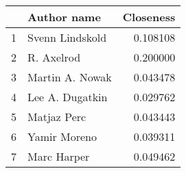 \begin{tabular}{llr}
\toprule
{} &      Author name &  Closeness \\
\midrule
1 &  Svenn Lindskold &   0.108108 \\
2 &       R. Axelrod &   0.200000 \\
3 &  Martin A. Nowak &   0.043478 \\
4 &  Lee A. Dugatkin &   0.029762 \\
5 &      Matjaz Perc &   0.043443 \\
6 &     Yamir Moreno &   0.039311 \\
7 &      Marc Harper &   0.049462 \\
\bottomrule
\end{tabular}
